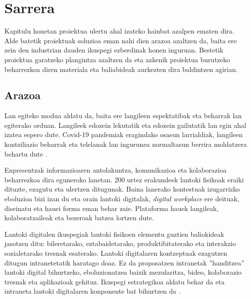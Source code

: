 \chapter{Sarrera}


     Kapitulu honetan proiektua ulertu ahal izateko hainbat azalpen ematen dira. Alde batetik proiektuak soluzioa eman nahi dien arazoa azaltzen da, baita ere zein den industrian dauden ikuspegi ezberdinak honen inguruan. Bestetik proiektua garatzeko plangintza azaltzen da eta azkenik proiektua burutzeko beharrezkoa diren materiala eta baliabideak aurkezten dira baldintzen agirian.


\section{Arazoa}
Lan egiteko modua aldatu da, baita ere langileen espektatibak eta beharrak lan egiterako 
orduan. Langileek edozein lekutatik eta edozein gailutatik lan egin ahal izatea espero dute. 
Covid-19 pandemiak eragindako osasun larrialdiak, langileen kontziliazio beharrak eta telelanak lan ingurunea normaltasun berrira moldatzera behartu dute \cite{mckinsey-survey}.

Enpresentzak informazioaren antolakuntza, komunikazioa eta kolaborazioa beharrezkoa
dira eguneroko lanetan. 200 urtez erakundeek lantoki fisikoak eraiki dituzte,
ezagutu eta ulertzen ditugunak. Baina lanerako kontestuak izugarrizko eboluzioa bizi 
izan du eta orain lantoki digitalak, \emph{digital workplace} ere deituak, diseinatu eta hauei forma eman behar zaie. Plataforma hauek langileak, kolaboratzaileak eta bezeroak batzea lortzen dute.

Lantoki digitalen ikuspegiak lantoki fisikoen elementu guztien baliokideak jasotzen 
ditu: bileretarako, eztabaidetarako, produktibitaterako eta interakzio sozialetarako
tresnak esaterako. Lantoki digitalaren kontzeptuak ezagutzen ditugun intranetetatik
haratago doaz. Ez da proposatzen intranetak ''handitzea'' lantoki digital bihurtzeko, 
eboluzionatzea baizik mezularitza, bideo, kolaborazio tresnak eta aplikazioak gehituz.
Ikuspegi estrategikoa aldatu behar da eta intraneta lantoki digitalaren konponente bat 
bihurtzen da \cite{dwg-from-intranet-to-digital-workplace}.

